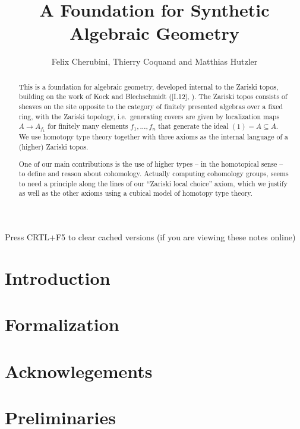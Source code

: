 \documentclass{../util/zariski}
\title{A Foundation for Synthetic Algebraic Geometry}
\author{Felix Cherubini, Thierry Coquand and Matthias Hutzler}
\begin{document}
\maketitle

\begin{center}
  \color{purple}
  \large{Press CRTL+F5 to clear cached versions}
  \large{(if you are viewing these notes online)}
\end{center}

\begin{abstract}
  This is a foundation for algebraic geometry, developed internal to the Zariski topos, building on the work of Kock and Blechschmidt (\cite{kock-sdg}[I.12], \cite{ingo-thesis}).
  The Zariski topos consists of sheaves on the site opposite to the category of finitely presented algebras over a fixed ring, with the Zariski topology, i.e.\ generating covers are given by localization maps $A\to A_{f_1}$ for finitely many elements $f_1,\dots,f_n$ that generate the ideal $(1)=A\subseteq A$.
  We use homotopy type theory together with three axioms as the internal language of a (higher) Zariski topos.

  One of our main contributions is the use of higher types -- in the homotopical sense -- to define and reason about cohomology.
  Actually computing cohomology groups, seems to need a principle along the lines of our ``Zariski local choice'' axiom,
  which we justify as well as the other axioms using a cubical model of homotopy type theory.
\end{abstract}

\tableofcontents

\section*{Introduction}


\section*{Formalization}


\section*{Acknowlegements}


\section{Preliminaries}

\end{document}
